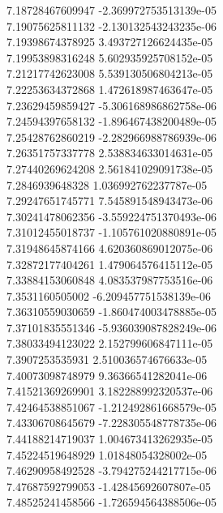 {7.18728467609947 -2.369972753513139e-05 \\
7.19075625811132 -2.130132543243235e-06 \\
7.19398674378925 3.493727126624435e-05 \\
7.19953898316248 5.602935925708152e-05 \\
7.21217742623008 5.539130506804213e-05 \\
7.22253634372868 1.472618987463647e-05 \\
7.23629459859427 -5.306168986862758e-06 \\
7.24594397658132 -1.896467438200489e-05 \\
7.25428762860219 -2.282966988786939e-06 \\
7.26351757337778 2.538834633014631e-05 \\
7.27440269624208 2.561841029091738e-05 \\
7.2846939648328 1.036992762237787e-05 \\
7.29247651745771 7.545891548943473e-06 \\
7.30241478062356 -3.559224751370493e-06 \\
7.31012455018737 -1.105761020880891e-05 \\
7.31948645874166 4.620360869012075e-06 \\
7.32872177404261 1.479064576415112e-05 \\
7.33884153060848 4.083537987753516e-06 \\
7.3531160505002 -6.209457751538139e-06 \\
7.36310559030659 -1.860474003478885e-05 \\
7.37101835551346 -5.936039087828249e-06 \\
7.38033494123022 2.152799606847111e-05 \\
7.3907253535931 2.510036574676633e-05 \\
7.40073098748979 9.36366541282041e-06 \\
7.41521369269901 3.182288992320537e-06 \\
7.42464538851067 -1.212492861668579e-05 \\
7.43306708645679 -7.228305548778735e-06 \\
7.44188214719037 1.004673413262935e-05 \\
7.45224519648929 1.01848054328002e-05 \\
7.46290958492528 -3.794275244217715e-06 \\
7.47687592799053 -1.42845692607807e-05 \\
7.48525241458566 -1.726594564388506e-05 \\
}
